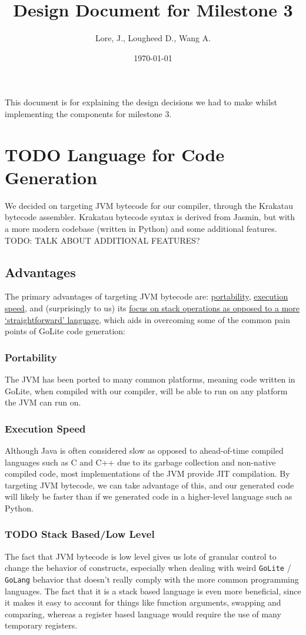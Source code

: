 \documentclass[11pt]{article}
\author{Lore, J., Lougheed D., Wang A.}
\date{\today}
\title{Design Document for Milestone 3}
\begin{document}
\maketitle
\tableofcontents

This document is for explaining the design decisions we had to make
whilst implementing the components for milestone 3.  \newpage
\section{{\bfseries\sffamily TODO} Language for Code Generation}
\label{sec:org82e2e9b}
We decided on targeting JVM bytecode for our compiler, through the Krakatau
bytecode assembler. Krakatau bytecode syntax is derived from Jasmin, but with
a more modern codebase (written in Python) and some additional features.
TODO: TALK ABOUT ADDITIONAL FEATURES?
\subsection{Advantages}
\label{sec:org29954db}
The primary advantages of targeting JVM bytecode are:
\hyperref[sec:orgdd32e26]{portability}, \hyperref[sec:org39fc4e8]{execution speed},
and (surprisingly to us) its \hyperref[sec:orgd4312e7]{focus on stack
operations as opposed to a more `straightforward' language}, which
aids in overcoming some of the common pain points of GoLite code
generation:
\subsubsection{Portability}
\label{sec:orgdd32e26}
The JVM has been ported to many common platforms, meaning code written in
GoLite, when compiled with our compiler, will be able to run on any
platform the JVM can run on.
\subsubsection{Execution Speed}
\label{sec:org39fc4e8}
Although Java is often considered slow as opposed to ahead-of-time compiled
languages such as C and C++ due to its garbage collection and non-native
compiled code, most implementations of the JVM provide JIT compilation.
By targeting JVM bytecode, we can take advantage of this, and our generated
code will likely be faster than if we generated code in a higher-level
language such as Python.
\subsubsection{{\bfseries\sffamily TODO} Stack Based/Low Level}
\label{sec:orgd4312e7}
The fact that JVM bytecode is low level gives us lots of granular
control to change the behavior of constructs, especially when
dealing with weird \texttt{GoLite} / \texttt{GoLang} behavior that doesn't
really comply with the more common programming languages. The fact
that it is a stack based language is even more beneficial, since
it makes it easy to account for things like function arguments,
swapping and comparing, whereas a register based language would
require the use of many temporary registers.
\end{document}
